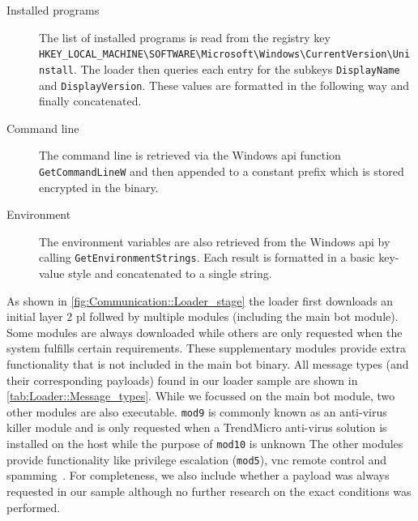 \begin{description}
    \item[Installed programs] The list of installed programs is read from the registry key \footnotesize{\lstinline|HKEY_LOCAL_MACHINE\SOFTWARE\Microsoft\Windows\CurrentVersion\Uninstall|}.
    The loader then queries each entry for the subkeys \lstinline|DisplayName| and \lstinline|DisplayVersion|.
    These values are formatted in the following way and finally concatenated.

    \item[Command line] The command line is retrieved via the Windows \gls{api} function \lstinline|GetCommandLineW| and then appended to a constant prefix which is stored encrypted in the binary.

    \item[Environment] The environment variables are also retrieved from the Windows \gls{api} by calling \lstinline|GetEnvironmentStrings|.
    Each result is formatted in a basic key-value style and concatenated to a single string.

\end{description}

As shown in \autoref{fig:Communication::Loader_stage} the loader first downloads an initial layer 2 \gls{pl} follwed by multiple modules (including the main bot module).
Some modules are always downloaded while others are only requested when the system fulfills certain requirements.
These supplementary modules provide extra functionality that is not included in the main bot binary.
All message types (and their corresponding payloads) found in our loader sample are shown in \autoref{tab:Loader::Message_types}.
While we focussed on the main bot module, two other modules are also executable.
\lstinline|mod9| is commonly known as an anti-virus killer module and is only requested when a TrendMicro anti-virus solution is installed on the host while the purpose of \lstinline|mod10| is unknown
The other modules provide functionality like privilege escalation (\lstinline|mod5|), \gls{vnc} remote control and spamming~\cite{wayne2016whats, obrien2016dridex}.
For completeness, we also include whether a payload was always requested in our sample although no further research on the exact conditions was performed.

